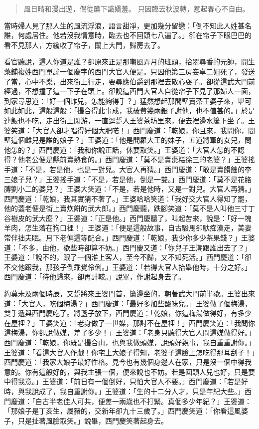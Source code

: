 \begin{quote}
風日晴和漫出遊，偶從簾下識嬌羞。
只因臨去秋波轉，惹起春心不自由。
\end{quote}

當時婦人見了那人生的風流浮浪，語言甜凈，更加幾分留戀：「倒不知此人姓甚名誰，何處居住。他若沒我情意時，臨去也不回頭七八遍了。」卻在帘子下眼巴巴的看不見那人，方纔收了帘子，關上大門，歸房去了。

看官聽說，這人你道是誰？卻原來正是那嘲風弄月的班頭，拾翠尋香的元帥，開生藥鋪複姓西門單諱一個慶字的西門大官人便是。只因他第三房妾卓二姐死了，發送了當，心中不樂，出來街上行走，要尋應伯爵到那裡去散心耍子。卻從這武大門前經過，不想撞了這一下子在頭上。卻說這西門大官人自從帘子下見了那婦人一面，到家尋思道：「好一個雌兒，怎能夠得手？」猛然想起那間壁賣茶王婆子來，堪可如此如此，這般這般：「撮合得此事成，我破費幾兩銀子謝他，也不值甚的。」於是連飯也不吃，走出街上閑游，一直逕踅入王婆茶坊里來，便去裡邊水簾下坐了。王婆笑道：「大官人卻才唱得好個大肥喏！」西門慶道：「乾娘，你且來，我問你，間壁這個雌兒是誰的娘子？」王婆道：「他是閻羅大王的妹子，五道將軍的女兒，問他怎的？」西門慶道：「我和你說正話，休要取笑。」王婆道：「大官人怎的不認得？他老公便是縣前賣熟食的。」西門慶道：「莫不是賣棗糕徐三的老婆？」王婆搖手道：「不是，若是他，也是一對兒。大官人再猜。」西門慶道：「敢是賣餶飿的李三娘子兒？」王婆搖手道：「不是，若是他，倒是一雙。」西門慶道：「莫不是花胳膊劉小二的婆兒？」王婆大笑道：「不是，若是他時，又是一對兒。大官人再猜。」西門慶道：「乾娘，我其實猜不著了。」王婆哈哈笑道：「我好交大官人得知了罷，他的蓋老便是街上賣炊餅的武大郎。」西門慶聽，跌腳笑道：「莫不是人叫他三寸丁谷樹皮的武大麼？」王婆道：「正是他。」西門慶聽了，叫起苦來，說是：「好一塊羊肉，怎生落在狗口裡！」王婆道：「便是這般故事，自古駿馬卻馱痴漢走，美妻常伴拙夫眠。月下老偏這等配合。」西門慶道：「乾娘，我少你多少茶果錢？」王婆道：「不多，由他，歇些時卻算不妨。」西門慶又道：「你兒子王潮跟誰出去了？」王婆道：「說不的，跟了一個淮上客人，至今不歸，又不知死活。」西門慶道：「卻不交他跟我，那孩子倒乖覺伶俐。」王婆道：「若得大官人抬舉他時，十分之好。」西門慶道：「待他歸來，卻再計較。」說畢，作謝起身去了。

約莫未及兩個時辰，又踅將來王婆門首，簾邊坐的，朝著武大門前半歇。王婆出來道：「大官人，吃個梅湯？」西門慶道：「最好多加些酸味兒。」王婆做了個梅湯，雙手遞與西門慶吃了。將盞子放下，西門慶道：「乾娘，你這梅湯做得好，有多少在屋裡？」王婆笑道：「老身做了一世媒，那討不在屋裡！」西門慶笑道：「我問你這梅湯，你卻說做媒，差了多少！」王婆道：「老身只聽得大官人問這媒做得好。」西門慶道：「乾娘，你既是撮合山，也與我做頭媒，說頭好親事，我自重重謝你。」王婆道：「看這大官人作戲！你宅上大娘子得知，老婆子這臉上怎吃得那耳刮子！」西門慶道：「我家大娘子最好性格。見今也有幾個身邊人在家，只是沒一個中得我意的。你有這般好的，與我主張一個，便來說也不妨。若是回頭人兒也好，只是要中得我意。」王婆道：「前日有一個倒好，只怕大官人不要。」西門慶道：「若是好時，與我說成了，我自重謝你。」王婆道：「生的十二分人才，只是年紀大些。」西門慶道：「自古半老佳人可共，便差一兩歲也不打緊。真個多少年紀？」王婆道：「那娘子是丁亥生，屬豬的，交新年卻九十三歲了。」西門慶笑道：「你看這風婆子，只是扯著風臉取笑。」說畢，西門慶笑著起身去。

